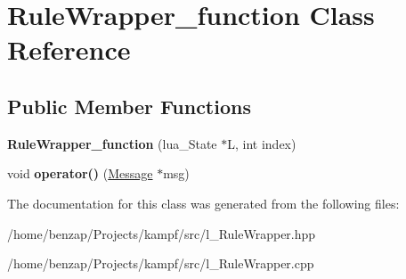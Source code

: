 \hypertarget{classRuleWrapper__function}{\section{Rule\-Wrapper\-\_\-function Class Reference}
\label{classRuleWrapper__function}
}
\subsection*{Public Member Functions}
\begin{DoxyCompactItemize}
\item 
\hypertarget{classRuleWrapper__function_a2a4ff9ac99f60d4b7f7d1985eab4f659}{{\bfseries Rule\-Wrapper\-\_\-function} (lua\-\_\-\-State $\ast$L, int index)}\label{classRuleWrapper__function_a2a4ff9ac99f60d4b7f7d1985eab4f659}

\item 
\hypertarget{classRuleWrapper__function_a44ab99b23150a5f466ebce14e487f304}{void {\bfseries operator()} (\hyperlink{classMessage}{Message} $\ast$msg)}\label{classRuleWrapper__function_a44ab99b23150a5f466ebce14e487f304}

\end{DoxyCompactItemize}


The documentation for this class was generated from the following files\-:\begin{DoxyCompactItemize}
\item 
/home/benzap/\-Projects/kampf/src/l\-\_\-\-Rule\-Wrapper.\-hpp\item 
/home/benzap/\-Projects/kampf/src/l\-\_\-\-Rule\-Wrapper.\-cpp\end{DoxyCompactItemize}
